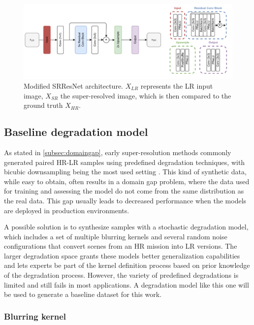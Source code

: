     \begin{figure}[H]
        \centering
        \includegraphics[width=1\textwidth]{Includes/3-srresnet-architecture.pdf}
        \caption{ Modified SRResNet architecture. $X_{LR}$ represents the LR input image, $X_{SR}$ the super-resolved image, which is then compared to the ground truth $X_{HR}$.}
        \label{fig:3-resnet-architecture}
     \end{figure}
    
    \subsection{Baseline degradation model} \label{subsec:baseline_degradation_model}

        As stated in \ref{subsec:domaingap}, early super-resolution methods commonly generated paired HR-LR samples using predefined degradation techniques, with bicubic downsampling being the most used setting \cite{zhang2018residual}.
        This kind of synthetic data, while easy to obtain, often results in a domain gap problem, where the data used for training and assessing the model do not come from the same distribution as the real data. This gap usually leads to decreased performance when the models are deployed in production environments.
        
        A possible solution is to synthesize samples with a stochastic degradation model, which includes a set of multiple blurring kernels and several random noise configurations that convert scenes from an HR mission into LR versions.
        The larger degradation space grants these models better generalization capabilities and lets experts be part of the kernel definition process based on prior knowledge of the degradation process.
        However, the variety of predefined degradations is limited and still fails in most applications. A degradation model like this one will be used to generate a baseline dataset for this work.
        

        \subsubsection{Blurring kernel}

